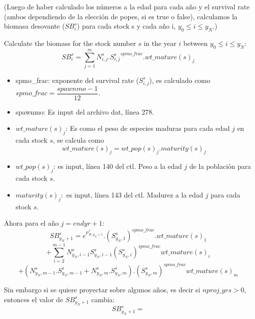 \documentclass{article}
\begin{document}
(Luego de haber calculado los números a la edad para cada año y el survival rate (ambos dependiendo de la elección de popes, si es true o false), calculamos la biomasa desovante ($SB^s_i$) para cada stock s y cada año i, $y_0 \leq i \leq y_N$.)

Calculate the biomass for the stock number $s$ in the year $i$ between $y_0 \leq i \leq y_N$:
    \begin{equation}
    SB^s_i=\sum_{j=1}^{m}N^s_{i,j}.{S^s_{i,j}}^{spmo\_frac}.wt\_mature(s)_j
\end{equation}
\begin{itemize}
    \item spmo\_frac: exponente del survival rate ($S^s_{i,j}$), es calculado como 
    $spmo\_frac=\dfrac{spawnmo-1}{12}$.
    \item spawnmo: Es input del archivo dat, línea 278.
    \item $wt\_mature(s)_j$: Es como el peso de especies maduras para cada edad $j$ en cada stock $s$, se calcula como
    \begin{equation}
        wt\_mature(s)_j=wt\_pop(s)_j.maturity(s)_j
    \end{equation}
\end{itemize}
\begin{itemize}
    \item $wt\_pop(s)_j$: es input, línea 140 del ctl. Peso a la edad $j$ de la población para cada stock $s$.
    \item $maturity(s)_j:$ es input, línea 143 del ctl. Madurez a la edad $j$ para cada stock $s$.
\end{itemize}
Ahora para el año $j=endyr+1$:
\begin{equation}
    SB^s_{y_N+1}=e^{\mu^s_{R,y_N+1}}.(S^{s}_{y_N,1})^{spmo\_frac
    }.wt\_mature(s)_1
\end{equation}
\begin{equation*}
+\sum_{i=2}^{m-1}N^{s}_{y_N,i-1}S^{s}_{y_N,i-1}(S^s_{y_N,i})^{spmo\_frac}wt\_mature(s)_i
\end{equation*}
\begin{equation*}
    +(N^{s}_{y_N,m-1}.S^s_{y_N,m-1}+N^s_{y_N,m}.S^s_{y_N,m}).(S^s_{y_N,m})^{spmo\_frac}wt\_mature(s)_{m}
\end{equation*}

Sin embargo si se quiere proyectar sobre algunos años, es decir si $nproj\_yrs>0$, entonces el valor de $SB^s_{y_N+1}$ cambia:
\begin{equation}
    SB^s_{y_N+1}=
\end{equation}
\end{document}
